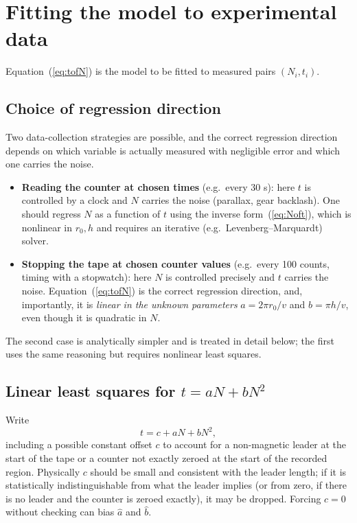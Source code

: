 \documentclass[12pt,oneside,a4paper]{article}
\newcommand{\be}{\begin{equation}}
\newcommand{\ee}{\end{equation}}
\begin{document}
\section{Fitting the model to experimental data}

Equation~(\ref{eq:tofN}) is the model to be fitted to measured pairs
$(N_i, t_i)$.

\subsection{Choice of regression direction}

Two data-collection strategies are possible, and the correct
regression direction depends on which variable is actually measured
with negligible error and which one carries the noise.
\begin{itemize}
\item \textbf{Reading the counter at chosen times} (e.g.\ every 30 s):
  here $t$ is controlled by a clock and $N$ carries the noise
  (parallax, gear backlash). One should regress $N$ as a function of
  $t$ using the inverse form~(\ref{eq:Noft}), which is nonlinear in
  $r_0,h$ and requires an iterative (e.g.\ Levenberg--Marquardt)
  solver.
\item \textbf{Stopping the tape at chosen counter values} (e.g.\
  every 100 counts, timing with a stopwatch): here $N$ is controlled
  precisely and $t$ carries the noise. Equation~(\ref{eq:tofN}) is
  the correct regression direction, and, importantly, it is
  \emph{linear in the unknown parameters} $a = 2\pi r_0/v$ and
  $b = \pi h/v$, even though it is quadratic in $N$.
\end{itemize}
The second case is analytically simpler and is treated in detail
below; the first uses the same reasoning but requires nonlinear
least squares.

\subsection{Linear least squares for $t = aN + bN^2$}

Write
\be
t = c + aN + bN^2,
\label{eq:fitmodel}
\ee
including a possible constant offset $c$ to account for a
non-magnetic leader at the start of the tape or a counter not
exactly zeroed at the start of the recorded region. Physically
$c$ should be small and consistent with the leader length; if it is
statistically indistinguishable from what the leader implies (or
from zero, if there is no leader and the counter is zeroed exactly),
it may be dropped. Forcing $c=0$ without checking can bias $\hat a$
and $\hat b$.
\end{document}
